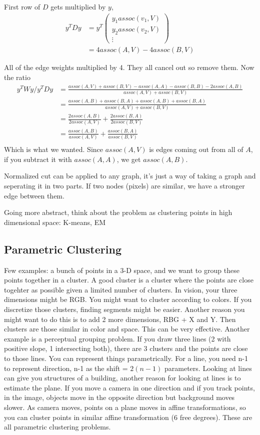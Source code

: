 First row of $D$ gets multiplied by $y$, 
\begin{align*}
y^TDy &= y^T
\begin{pmatrix}
  y_1assoc(v_1,V)\\
  y_2assoc(v_2,V)\\
\vdots
\end{pmatrix}\\
&=  4assoc(A,V) -4assoc(B, V)  
\end{align*}

All of the edge weights multiplied by 4. They all cancel out so remove
them.
Now the ratio 
\begin{align*}
y^TWy/y^TDy &= \frac{assoc(A,V) + assoc(B,V) - assoc(A,A) -
assoc(B,B) - 2assoc(A,B)}{assoc(A,V) + assoc(B,V)}\\  
&=\frac{assoc(A,B) + assoc(B,A) + assoc(A,B) + assoc(B,A)}{assoc(A,V)
  + assoc(B,V)}\\
&=\frac{2assoc(A,B)}{2assoc(A,V)} + \frac{2assoc(B,A)}{2assoc(B,V)}\\
&=\frac{assoc(A,B)}{assoc(A,V)} + \frac{assoc(B,A)}{assoc(B,V)}\\
\end{align*}
Which is what we wanted.
Since $assoc(A,V)$ is edges coming out from all of $A$, if you
subtract it with $assoc(A,A)$, we get $assoc(A,B)$.

Normalized cut can be applied to any graph, it's just a way of taking
a graph and seperating it in two parts. If two nodes (pixels) are
similar, we have a stronger edge between them.

Going more abstract, think about the problem as clustering points in
high dimensional space: K-means, EM

\subsection{Parametric Clustering}
Few examples: a bunch of points in a 3-D space, and we  want to group these
points together in a cluster. A good cluster is a cluster where the
points are close togehter as possible given a limited number of
clusters. In vision, your three dimensions might be RGB. You might
want to cluster according to colors. If you discretize those clusters,
finding segments might be easier. Another reason you might want to do
this is to add 2 more dimensions, RBG + X and Y. Then clusters are
those similar in color and space. This can be very effective.
Another example is a perceptual grouping problem. If you draw three
lines (2 with positive slope, 1 intersecting both), there are 3
clusters and the points are close to those lines. You can represent
things parametrically. For a line, you need n-1 to
represent direction, n-1 as the shift = $2(n-1)$ parameters.
Looking at lines can give you structures of a building, another reason
for looking at lines is to estimate the plane. If you move a camera in
one direction and if you track points, in the image, objects move in
the opposite direction but background moves slower. As camera moves,
points on a plane moves in affine transformations, so you can cluster
points in similar affine transformation (6 free degrees). These are
all parametric clustering problems.

